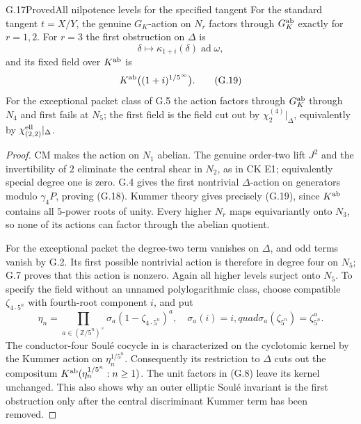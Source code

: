 \begin{statement}{G.17}{Proved}{All nilpotence levels for the specified tangent}
For the standard tangent $t=X/Y$, the genuine $G_K$-action on
$N_r$ factors through $G_K^{\rm ab}$ exactly for $r=1,2$.
For $r=3$ the first obstruction on $\Delta$ is
\[
 \delta\longmapsto\kappa_{1+i}(\delta)\operatorname{ad}\omega,
 \tag{G.18}
\]
and its fixed field over $K^{\rm ab}$ is
\[
       K^{\rm ab}\bigl((1+i)^{1/5^\infty}\bigr).
 \tag{G.19}
\]
For the exceptional packet class of G.5 the action factors
through $G_K^{\rm ab}$ through $N_4$ and first fails at $N_5$;
the first field is the field cut out by
$\chi^{(4)}_2|_\Delta$, equivalently by
$\chi^{\rm ell}_{(2,2)}|_\Delta$.
\end{statement}
\begin{proof}
CM makes the action on $N_1$ abelian. The genuine order-two
lift $J^2$ and the invertibility of $2$ eliminate the central
shear in $N_2$, as in CK E1; equivalently special degree one
is zero. G.4 gives the first nontrivial $\Delta$-action on
generators modulo $\gamma_4P$, proving (G.18). Kummer theory
gives precisely (G.19), since $K^{\rm ab}$ contains all
$5$-power roots of unity. Every higher $N_r$ maps
equivariantly onto $N_3$, so none of its actions can factor
through the abelian quotient.

For the exceptional packet the degree-two term vanishes on
$\Delta$, and odd terms vanish by G.2. Its first possible
nontrivial action is therefore in degree four on $N_5$;
G.7 proves that this action is nonzero. Again all higher
levels surject onto $N_5$. To specify the field without an
unnamed polylogarithmic class, choose compatible
$\zeta_{4\cdot5^n}$ with fourth-root component $i$, and put
\[
 \eta_n=\prod_{a\in(\mathbb Z/5^n)^\times}
          \sigma_a(1-\zeta_{4\cdot5^n})^a,
 \quad
 \sigma_a(i)=i,quad
 \sigma_a(\zeta_{5^n})=\zeta_{5^n}^{a}.
\]
The conductor-four Soul\'e cocycle in
\citet[Definition 2.14 and Remark 2.15(2)]{IshiiGoto2026}
is characterized on the cyclotomic kernel by the Kummer
action on $\eta_n^{1/5^n}$. Consequently its restriction
to $\Delta$ cuts out the compositum
$K^{\rm ab}(\eta_n^{1/5^n}:n\ge1)$. The unit factors in
(G.8) leave its kernel unchanged. This also shows why an
outer elliptic Soul\'e invariant is the first obstruction
only after the central discriminant Kummer term has been
removed.
\end{proof}

